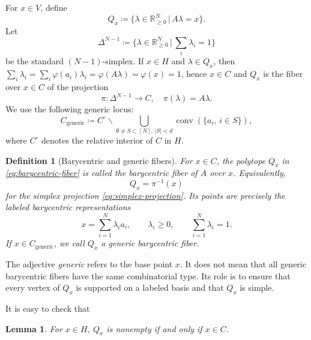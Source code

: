 \documentclass[12pt]{amsart}
\newtheorem{definition}[theorem]{Definition}
\newtheorem{lemma}[theorem]{Lemma}
\numberwithin{equation}{section}
\numberwithin{theorem}{section}
\newcommand{\op}{\operatorname}
\newcommand{\R}{\mathbb{R}}
\begin{document}
For $x\in V$, define
\begin{equation}
  \label{eq:barycentric-fiber}
  Q_x\coloneqq \{\lambda\in \R^N_{\geq0}\,|\, A\lambda=x\}.
\end{equation}
Let
\begin{equation*}
  \Delta^{N-1}\coloneqq \{\lambda\in \R^N_{\geq0}\,|\, \sum_i\lambda_i=1\}
\end{equation*}
be the standard $(N-1)$-simplex.
If $x\in H$ and $\lambda\in Q_x$, then $\sum_i\lambda_i=\sum_i \varphi(a_i)\lambda_i=\varphi(A\lambda)=\varphi(x)=1$, hence $x\in C$ and $Q_x$ is the fiber over $x\in C$ of the projection
\begin{equation}
  \label{eq:simplex-projection}
  \pi: \Delta^{N-1}\to C,\quad \pi(\lambda)=A\lambda.
\end{equation}
We use the following generic locus:
\begin{equation}
  \label{eq:generic-locus}
  C_{\mathrm{generic}}\coloneqq C^{\circ}\backslash \bigcup_{\emptyset\neq S\subset[N],\,|S|<d}\op{conv}(\{a_i,\, i\in S\}),
\end{equation}
where $C^\circ$ denotes the relative interior of $C$ in $H$.

\begin{definition}[Barycentric and generic fibers]
  \label{def:barycentric-fiber}
  For $x\in C$, the polytope $Q_x$ in \eqref{eq:barycentric-fiber} is called the \emph{barycentric fiber of $A$ over $x$}.
  Equivalently,
  \[
    Q_x=\pi^{-1}(x)
  \]
  for the simplex projection \eqref{eq:simplex-projection}.
  Its points are precisely the labeled barycentric representations
  \[
    x=\sum_{i=1}^{N}\lambda_i a_i, \qquad \lambda_i\geq 0, \qquad \sum_{i=1}^{N}\lambda_i=1.
  \]
  If $x\in C_{\mathrm{generic}}$, we call $Q_x$ a \emph{generic barycentric fiber}.
\end{definition}

The adjective \emph{generic} refers to the base point $x$. It does not mean that all generic barycentric fibers have the same combinatorial type. Its role is to ensure that every vertex of $Q_x$ is supported on a labeled basis and that $Q_x$ is simple.

It is easy to check that
\begin{lemma}
  For $x\in H$, $Q_x$ is nonempty if and only if $x\in C$. 
\end{lemma}
\end{document}
